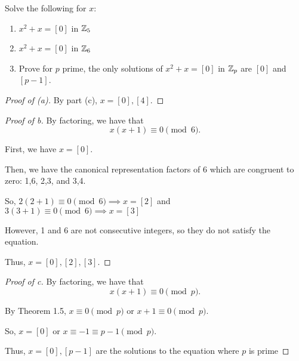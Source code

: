 \documentclass[../hw1]{subfiles}
\begin{document}
\begin{problem}[12]
Solve the following for $x$:
\begin{enumerate}[label=\alph*)]
	\item $x^2+x=[0]$ in $\mathbb{Z}_5$
	\item $x^2+x=[0]$ in $\mathbb{Z}_6$
	\item Prove for $p$ prime,  the only solutions of $x^2+x=[0]$ in $\mathbb{Z}_p$ are $[0]$ and $[p-1]$.
\end{enumerate}
\end{problem}
\begin{proof}[Proof of (a)]
	By part (c), $x=[0],[4]$.
\end{proof}
\begin{proof}[Proof of b]
	By factoring, we have that \[
		x(x+1)\equiv 0 \pmod{6}
		.\]

	First, we have $x=[0]$.

	Then, we have the canonical representation factors of $6$ which are congruent to zero: {1,6}, {2,3}, and {3,4}.

	So,  $2(2+1)\equiv 0 \pmod{6} \implies x = [2]$ and $3(3+1)\equiv 0 \pmod{6} \implies x = [3]$

	However, 1 and 6 are not consecutive integers, so they do not satisfy the equation.

	Thus, $x = [0], [2], [3]$.
\end{proof}
\begin{proof}[Proof of c]
	By factoring, we have that \[
		x(x+1)\equiv0\pmod{p}
		.\]

	By Theorem 1.5, $x\equiv 0 \pmod{p}$ or $x+1\equiv 0 \pmod{p}$.

	So, $x=[0]$ or $x\equiv -1 \equiv p-1 \pmod{p}$.

	Thus, $x = [0], [p-1]$ are the solutions to the equation where $p$ is prime
\end{proof}
\end{document}
